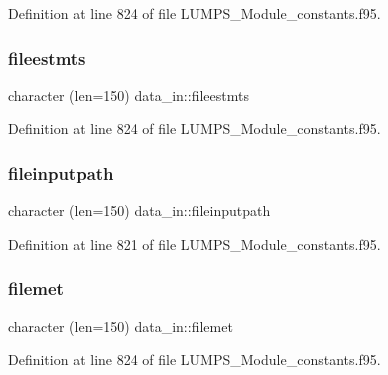Definition at line 824 of file L\+U\+M\+P\+S\+\_\+\+Module\+\_\+constants.\+f95.

\mbox{\label{namespacedata__in_a01c2281eb3d97cb6f8fbd7b5e03d33e2}} 
\subsubsection{\texorpdfstring{fileestmts}{fileestmts}}
{\footnotesize\ttfamily character (len=150) data\+\_\+in\+::fileestmts}



Definition at line 824 of file L\+U\+M\+P\+S\+\_\+\+Module\+\_\+constants.\+f95.

\mbox{\label{namespacedata__in_a67f60bb1f8edd3c6be5380ab655fe7f1}} 
\subsubsection{\texorpdfstring{fileinputpath}{fileinputpath}}
{\footnotesize\ttfamily character (len=150) data\+\_\+in\+::fileinputpath}



Definition at line 821 of file L\+U\+M\+P\+S\+\_\+\+Module\+\_\+constants.\+f95.

\mbox{\label{namespacedata__in_a47dbe76dba82734e5409c2ee5cc0a1d8}} 
\subsubsection{\texorpdfstring{filemet}{filemet}}
{\footnotesize\ttfamily character (len=150) data\+\_\+in\+::filemet}



Definition at line 824 of file L\+U\+M\+P\+S\+\_\+\+Module\+\_\+constants.\+f95.

\mbox{\label{namespacedata__in_a9cc7b5d1b7fbb824210f4f81d0498bd0}} 
